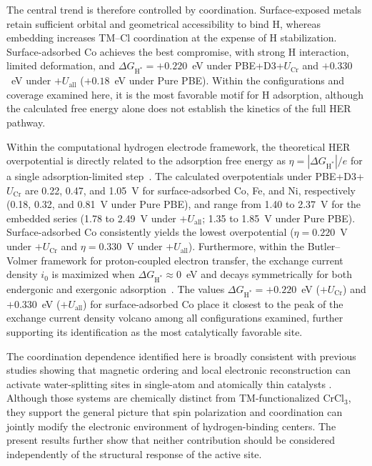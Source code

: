 \documentclass[journal=jacsat,manuscript=article]{achemso}
\begin{document}
{\color{revcolor}%
  The central trend is therefore controlled by coordination. Surface-exposed metals retain sufficient orbital and geometrical accessibility to bind H, whereas embedding increases TM--Cl coordination at the expense of H stabilization. Surface-adsorbed Co achieves the best compromise, with strong H interaction, limited deformation, and $\Delta G_{\mathrm{H}^*}=+0.220$~eV under PBE+D3+$U_{\mathrm{Cr}}$ and $+0.330$~eV under $+U_{\mathrm{all}}$ ($+0.18$~eV under Pure PBE). Within the configurations and coverage examined here, it is the most favorable motif for H adsorption, although the calculated free energy alone does not establish the kinetics of the full HER pathway.
\par}

{\color{revcolor}%
  Within the computational hydrogen electrode framework, the theoretical HER overpotential is directly related to the adsorption free energy as $\eta = |\Delta G_{\mathrm{H}^*}|/e$ for a single adsorption-limited step~\cite{Norskov_2005,Moraes2026,ASS2026_166886}. The calculated overpotentials under PBE+D3+$U_{\mathrm{Cr}}$ are 0.22, 0.47, and 1.05~V for surface-adsorbed Co, Fe, and Ni, respectively (0.18, 0.32, and 0.81~V under Pure PBE), and range from 1.40 to 2.37~V for the embedded series (1.78 to 2.49~V under $+U_{\mathrm{all}}$; 1.35 to 1.85~V under Pure PBE). Surface-adsorbed Co consistently yields the lowest overpotential ($\eta = 0.220$~V under $+U_{\mathrm{Cr}}$ and $\eta = 0.330$~V under $+U_{\mathrm{all}}$). Furthermore, within the Butler--Volmer framework for proton-coupled electron transfer, the exchange current density $i_0$ is maximized when $\Delta G_{\mathrm{H}^*} \approx 0$~eV and decays symmetrically for both endergonic and exergonic adsorption~\cite{Norskov_2005}. The values $\Delta G_{\mathrm{H}^*} = +0.220$~eV ($+U_{\mathrm{Cr}}$) and $+0.330$~eV ($+U_{\mathrm{all}}$) for surface-adsorbed Co place it closest to the peak of the exchange current density volcano among all configurations examined, further supporting its identification as the most catalytically favorable site.
\par}

The coordination dependence identified here is broadly consistent with previous studies showing that magnetic ordering and local electronic reconstruction can activate water-splitting sites in single-atom and atomically thin catalysts \cite{Sun2023,Duan2021}. Although those systems are chemically distinct from TM-functionalized CrCl$_3$, they support the general picture that spin polarization and coordination can jointly modify the electronic environment of hydrogen-binding centers. The present results further show that neither contribution should be considered independently of the structural response of the active site.
\end{document}
